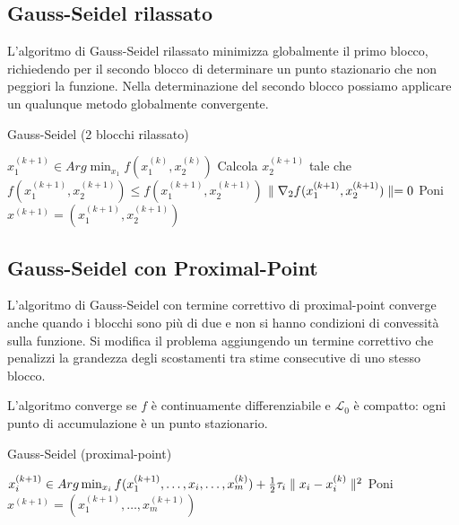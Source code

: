 \subsection{Gauss-Seidel rilassato}
\label{sec:methods.decomposition.gauss-seidel.relaxed}
L'algoritmo di Gauss-Seidel rilassato minimizza globalmente il primo blocco, richiedendo per il secondo blocco di determinare un punto stazionario che non peggiori la funzione. Nella determinazione del secondo blocco possiamo applicare un qualunque metodo globalmente convergente.

\begin{algorithm}
  \label{alg:methods.decomposition.gauss-seidel.relaxed}
  \caption{Gauss-Seidel (2 blocchi rilassato)}

   {
    $x_{1}^{(k+1)}\in Arg \min_{x_{1}} f(x_{1}^{(k)},x_{2}^{(k)})$
    Calcola $x_{2}^{(k+1)}$ tale che
    $f(x_{1}^{(k+1)},x_{2}^{(k+1)}) \leq f(x_{1}^{(k+1)},x_{2}^{(k+1)})$
    $\parallel \nabla_{2}f(x_{1}^{(k+1)},x_{2}^{(k+1)}) \parallel=0$
  }
  Poni $x^{(k+1)}=(x_{1}^{(k+1)},x_{2}^{(k+1)})$
\end{algorithm}


\subsection{Gauss-Seidel con Proximal-Point}
\label{sec:methods.decomposition.gauss-seidel.proximal-point}
L'algoritmo di Gauss-Seidel con termine correttivo di proximal-point converge anche quando i blocchi sono più di due e non si hanno condizioni di convessità sulla funzione. Si modifica il problema aggiungendo un termine correttivo che penalizzi la grandezza degli scostamenti tra stime consecutive di uno stesso blocco.

L'algoritmo converge se $f$ è continuamente differenziabile e $\mathcal{L}_{0}$ è compatto: ogni punto di accumulazione è un punto stazionario.

\begin{algorithm}
  \label{alg:methods.decomposition.gauss-seidel.proximal-point}
  \caption{Gauss-Seidel (proximal-point)}

   {
     {
      $x_{i}^{(k+1)}\in Arg \min_{x_{i}} f(x_{1}^{(k+1)},\ldots,x_{i},\ldots,x_{m}^{(k)}) + \frac{1}{2}\tau_{i}\parallel x_{i}-x_{i}^{(k)} \parallel^2$
    }
    Poni $x^{(k+1)}=(x_{1}^{(k+1)},\ldots,x_{m}^{(k+1)})$
  }
\end{algorithm}



